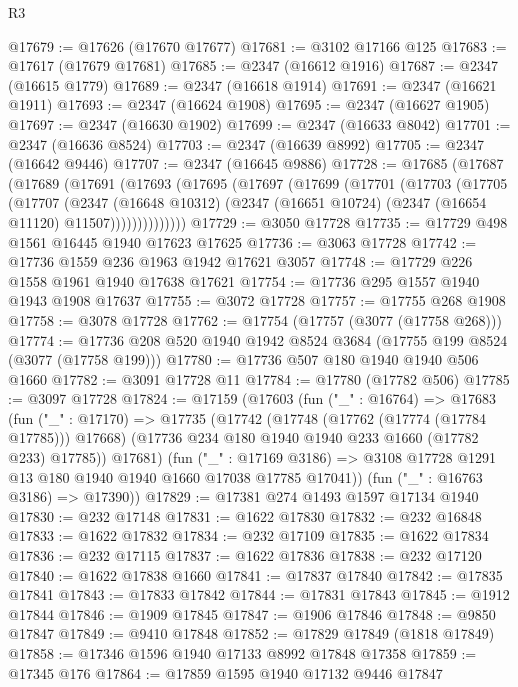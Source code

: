 \begin{lexlean}{R3}
\begin{coremodule}
@17679 := @17626 (@17670 @17677)
@17681 := @3102 @17166 @125
@17683 := @17617 (@17679 @17681)
@17685 := @2347 (@16612 @1916)
@17687 := @2347 (@16615 @1779)
@17689 := @2347 (@16618 @1914)
@17691 := @2347 (@16621 @1911)
@17693 := @2347 (@16624 @1908)
@17695 := @2347 (@16627 @1905)
@17697 := @2347 (@16630 @1902)
@17699 := @2347 (@16633 @8042)
@17701 := @2347 (@16636 @8524)
@17703 := @2347 (@16639 @8992)
@17705 := @2347 (@16642 @9446)
@17707 := @2347 (@16645 @9886)
@17728 := @17685
    (@17687
      (@17689
        (@17691
          (@17693
            (@17695
              (@17697
                (@17699
                  (@17701
                    (@17703
                      (@17705
                        (@17707
                          (@2347
                            (@16648 @10312)
                            (@2347 (@16651 @10724) (@2347 (@16654 @11120) @11507))))))))))))))
@17729 := @3050 @17728
@17735 := @17729 @498 @1561 @16445 @1940 @17623 @17625
@17736 := @3063 @17728
@17742 := @17736 @1559 @236 @1963 @1942 @17621 @3057
@17748 := @17729 @226 @1558 @1961 @1940 @17638 @17621
@17754 := @17736 @295 @1557 @1940 @1943 @1908 @17637
@17755 := @3072 @17728
@17757 := @17755 @268 @1908
@17758 := @3078 @17728
@17762 := @17754 (@17757 (@3077 (@17758 @268)))
@17774 := @17736 @208 @520 @1940 @1942 @8524 @3684 (@17755 @199 @8524 (@3077 (@17758 @199)))
@17780 := @17736 @507 @180 @1940 @1940 @506 @1660
@17782 := @3091 @17728 @11
@17784 := @17780 (@17782 @506)
@17785 := @3097 @17728
@17824 := @17159
    (@17603
      (fun ("_" : @16764) =>
      @17683
        (fun ("_" : @17170) =>
        @17735
          (@17742
            (@17748 (@17762 (@17774 (@17784 @17785))) @17668)
            (@17736 @234 @180 @1940 @1940 @233 @1660 (@17782 @233) @17785))
          @17681)
        (fun ("_" : @17169 @3186) =>
        @3108 @17728 @1291 @13 @180 @1940 @1940 @1660 @17038 @17785 @17041))
      (fun ("_" : @16763 @3186) => @17390))
@17829 := @17381 @274 @1493 @1597 @17134 @1940
@17830 := @232 @17148
@17831 := @1622 @17830
@17832 := @232 @16848
@17833 := @1622 @17832
@17834 := @232 @17109
@17835 := @1622 @17834
@17836 := @232 @17115
@17837 := @1622 @17836
@17838 := @232 @17120
@17840 := @1622 @17838 @1660
@17841 := @17837 @17840
@17842 := @17835 @17841
@17843 := @17833 @17842
@17844 := @17831 @17843
@17845 := @1912 @17844
@17846 := @1909 @17845
@17847 := @1906 @17846
@17848 := @9850 @17847
@17849 := @9410 @17848
@17852 := @17829 @17849 (@1818 @17849)
@17858 := @17346 @1596 @1940 @17133 @8992 @17848 @17358
@17859 := @17345 @176
@17864 := @17859 @1595 @1940 @17132 @9446 @17847

\end{coremodule}
\end{lexlean}
